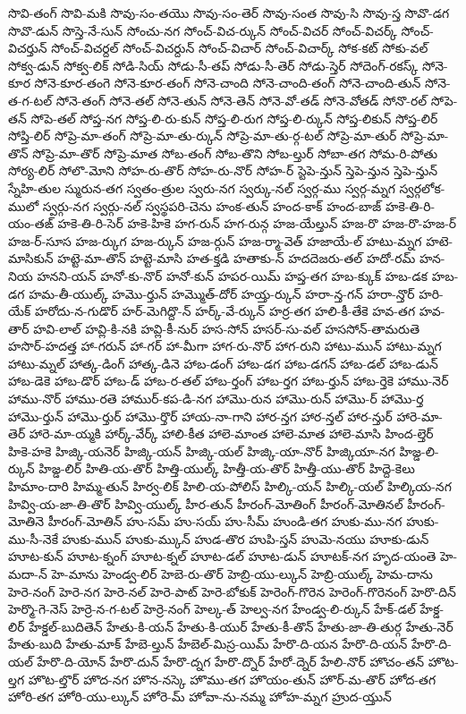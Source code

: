 {సొవి-తంగ్
సొవి-మకి
సొవు-సం-తయొ
సొవు-సం-తెర్
సొవు-సంత
సొవు-సి
సొవు-స్త
సొవొ-డగ
సొవొ-డున్
సొస్తె-నే-సున్
సోంచు-నగ
సోంచ్-విచ-ర్కున్
సోంచ్-విచర్
సోంచ్-విచర్క్
సోంచ్-విచర్తున్
సోంచ్-విచర్దల్
సోంచ్-విచర్దున్
సోంచ్-విచార్
సోంచ్-విచార్క్
సోక-కట్
సోకు-వల్
సోక్వ-డున్
సోక్వ-లిక్
సోడి-సియ్
సోడు-సీ-తప్
సోడు-సీ-తెర్
సోడు-స్తెర్
సోదెంగ్-రకస్క్
సోనె-కూర
సోనె-కూర-తంగె
సోనె-కూర-తంగ్
సోనె-చాంది
సోనె-చాంది-తంగ్
సోనె-చాంది-తున్
సోనె-త-గ-టల్
సోనె-తంగ్
సోనె-తల్
సోనె-తున్
సోనె-తెన్
సోనె-వో-తడ్
సోనె-వోతడ్
సోనొ-రల్
సోపె-తన్
సోపె-తల్
సోప్త-నగ
సోప్త-లి-రు-కున్
సోప్త-లి-రుగ
సోప్త-లి-ర్కున్
సోప్త-లికున్
సోప్త-లిర్
సోప్తి-లిర్
సోప్రె-మా-తంగ్
సోప్రె-మా-తు-ర్కున్
సోప్రె-మా-తు-ర్గ-టల్
సోప్రె-మా-తుర్
సోప్రె-మా-తొన్
సోప్రె-మా-తొర్
సోప్రె-మాత
సోబ-తంగ్
సోబ-తొని
సోబ-ల్తుర్
సోబా-తగ
సోమ-రి-పోతు
సోర్య-లిర్
సోలొ-మోని
సోహ-రు-తొర్
సోహ-రు-నొర్
సోహ-ర్
స్టెపె-న్తున్
స్తెపె-న్తున
స్తెపె-న్తున్
స్నేహి-తుల
స్మురున-తగ
స్వతం-త్రుల
స్వరు-నగ
స్వర్కు-నల్
స్వర్గ-ము
స్వర్గ-మ్నగ
స్వర్గలోక-ములో
స్వర్గు-నగ
స్వర్గు-నల్
స్వస్థపరి-చెను
హంక-తున్
హంద-కాక్
హంద-బాజ్
హకె-తి-రి-యం-తఙ్
హకె-తి-రి-సెర్
హకె-హికె
హగ-రున్
హగ-రున్గ
హజ-యేల్తున్
హజ-రొ
హజ-రొ-హజ-ర్
హజ-ర్-సూస
హజ-ర్కుగ
హజ-ర్కున్
హజ-ర్గున్
హజ-ర్మా-వెత్
హజాయే-ల్
హటు-మ్నగ
హటె-మాసికున్
హట్టె-మా-తొన్
హట్టె-మాసి
హత-క్తడి
హతాకు-న్
హదదెజరు-తల్
హదో-రమ్
హన-నియ
హనని-యన్
హనో-కు-నొర్
హనో-కున్
హపర-యిమ్
హప్త-తగ
హబ-క్కుక్
హబ-డక
హబ-డగ
హమ-తీ-యుల్క్
హమొ-ర్తున్
హమ్మొత్-దోర్
హయ్త-ర్కున్
హరా-న్త-గన్
హరా-న్తొర్
హరి-యేక్
హరోదు-న-గుడొర్
హర్-మెగిద్దొ-న్
హర్క్-వే-ర్కున్
హర్ర-తగ
హలి-కీ-తేకె
హవ-తగ
హవ-తార్
హవి-లాల్
హవ్లి-కి-నకి
హవ్లి-కీ-నుర్
హస-సోన్
హసర్-సు-వల్
హససోన్-తామరుతె
హసొర్-హదత్త
హా-గరున్
హా-గర్
హా-మీగా
హాగ-రు-నొర్
హాగ-రుని
హాటు-మున్
హాటు-మ్నగ
హాటు-మ్నల్
హాత్క-డింగ్
హాత్క-డినె
హాబ-డంగ్
హాబ-డగ
హాబ-డగన్
హాబ-డల్
హాబ-డున్
హాబ-డెకె
హాబ-డొర్
హాబ-డ్
హాబ-ర-తల్
హాబ-ర్తంగ్
హాబ-ర్తగ
హాబ-ర్తున్
హాబ-ర్తెకె
హాము-నెర్
హాము-నొర్
హాము-రతె
హాముర్-కప-డి-నగ
హామొ-రున
హామొ-రున్
హామొ-ర్
హామొ-ర్త
హామొ-ర్తున్
హామొ-ర్తుర్
హామొ-ర్తొర్
హాయ-నా-గాని
హార-న్తగ
హార-న్తల్
హార-న్తుర్
హారె-మా-తెర్
హారె-మా-య్మకి
హార్క్-వేర్క్
హాలి-కీత
హాలె-మాంత
హాలె-మాత
హాలె-మాసి
హింద-ల్తెర్
హికె-హకె
హిజ్కి-యనెర్
హిజ్కి-యన్
హిజ్కి-యల్
హిజ్కి-యా-నొర్
హిజ్కియా-నగ
హిజ్డ-లి-ర్కున్
హిజ్డ-లిర్
హితి-య-తొర్
హిత్తి-యుల్క్
హిత్తీ-య-తొర్
హిత్తీ-యు-తొర్
హిద్దె-కెలు
హిమాం-దారి
హిమ్మ-తున్
హిర్వ-లిక్
హిలి-య-పోలిస్
హిల్కి-యన్
హిల్కి-యల్
హిల్కియ-నగ
హివ్వి-య-జా-తి-తొర్
హివ్వి-యుల్క్
హీర-తున్
హీరంగ్-మోతింగ్
హీరంగ్-మోతినల్
హీరంగ్-మోతినె
హీరంగ్-మోతిన్
హు-సమ్
హు-సయ్
హు-సీమ్
హుండి-తగ
హుకు-ము-నగ
హుకు-ము-సీ-నెకే
హుకు-మున్
హుకు-మ్కున్
హుడ-తొర
హుపి-స్తన్
హుమె-నయు
హూకు-డున్
హూట-కున్
హూట-క్నంగ్
హూట-క్నల్
హూట-డల్
హూట-డున్
హూటక్-నగ
హృద-యంతె
హె-మదా-న్
హె-మాను
హెండ్వ-లిర్
హెబె-రు-తొర్
హెబ్రి-యు-ల్కున్
హెబ్రి-యుల్క్
హెమ-దాను
హెరె-నంగ్
హెరె-నగ
హెరె-నల్
హెరె-పాట్
హెరె-బోకుక్
హెరెంగ్-గొరెన
హెరెంగ్-గొరెనంగ్
హెరొ-దిన్
హెర్మొ-గె-నెస్
హెర్రె-న-గ-టల్
హెర్రె-నంగ్
హెల్క-త్
హెల్వ-నగ
హేండ్వ-లి-ర్కున్
హేక్-డల్
హేక్డ-లిర్
హేక్డల్-బుదితెన్
హేతు-కి-యన్
హేతు-కి-యుర్
హేతు-కీ-తొన్
హేతు-జా-తి-తుర్గ
హేతు-నెర్
హేతు-బుది
హేతు-మాక్
హేబె-ల్తున్
హేబెల్-మిస్ర-యిమ్
హేరొ-ది-యన
హేరొ-ది-యన్
హేరొ-ది-యల్
హేరొ-ది-యోన్
హేరొ-దున్
హేరొ-ద్నగ
హేరొ-ద్నొర్
హేరో-ద్నెర్
హేలి-నొర్
హొచం-తన్
హొట-ల్తగ
హొట-ల్తొర్
హొద-నగ
హొన-నస్కె
హొము-తగ
హొయం-తున్
హొర్-మ-తొర్
హోద-తగ
హోరి-తగ
హోరి-యు-ల్కున్
హోరె-మ్
హోవా-ను-నమ్మ
హోహ-మ్నగ
హ్రుద-య్తున్}